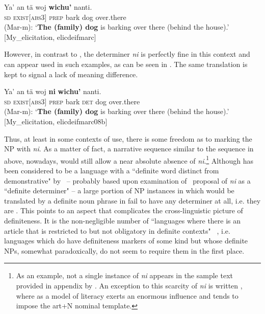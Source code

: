 \documentclass[output=paper
,modfonts
,nonflat]{langsci/langscibook}
\begin{document}
\ea \label{ex:pico:8}
\gll Ya' an t\"a woj \textbf{wichu'} nanti. \\
\textsc{sd} \textsc{exist[abs3]} \textsc{prep} {bark} {dog} {over.there} \\
\glt (Mar-m): `\textbf{The (family) dog} is barking over there (behind the house).' [My\_elicitation, elic\textunderscore deif\textunderscore marc]
\z


However, in contrast to , the determiner \textit{ni} is perfectly fine in this context and can appear used in such examples, as can be seen in . The same translation is kept to signal a lack of meaning difference.


\ea \label{ex:pico:9}
\gll Ya' an t\"a woj \textbf{ni} \textbf{wichu'} nanti. \\
\textsc{sd} \textsc{exist[abs3]} \textsc{prep} {bark} \textsc{det} {dog} {over.there} \\
\glt (Mar-m): `\textbf{The (family) dog} is barking over there (behind the house).' [My\_elicitation, elic\textunderscore deif\textunderscore marc\textunderscore08b]
\z


Thus, at least in some contexts of use, there is some freedom as to marking the NP with \textit{ni}. As a matter of fact, a narrative sequence similar to the sequence in  above, nowadays, would still allow a near absolute absence of \textit{ni}.\footnote{As an example, not a single instance of \textit{ni} appears in the sample text provided in appendix by \citet[][371--382]{Knowles1984}. An exception to this scarcity of \textit{ni} is written , where  as a model of literacy exerts an enormous influence and tends to impose the art+N nominal template.} Although  has been considered to be a language with a ``definite word distinct from demonstrative" by~\citet{Dryer2005definiteart} -- probably based upon examination of~ proposal of \textit{ni} as a ``definite determiner" -- a large portion of NP instances in  which would be translated by a definite noun phrase in  fail to have any determiner at all, i.e. they are . This points to an aspect that complicates the cross-linguistic picture of definiteness. It is the non-negligible number of ``languages where there is an article that is restricted to but not obligatory in definite contexts" ~\citep[e234]{Dryer2014}, i.e. languages which do have definiteness markers of some kind but whose definite NPs, somewhat paradoxically, do not seem to require them in the first place.
\end{document}
